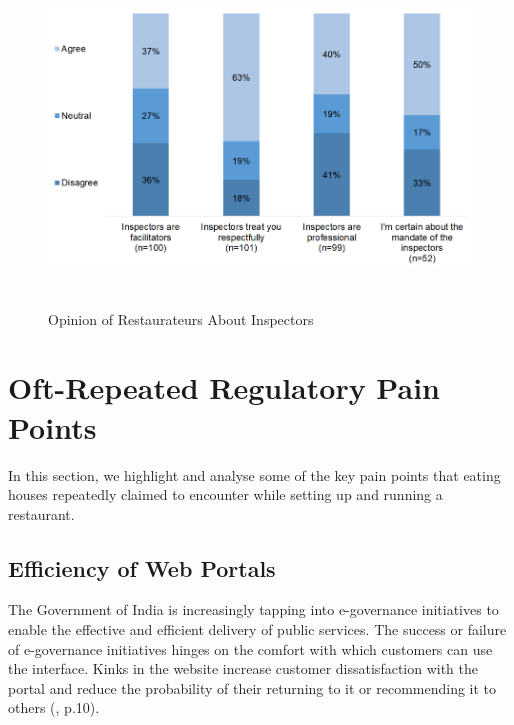 \documentclass[a4paper, 12pt, twoside]{article}
\begin{document}
		\begin{figure}[H]
                    	\centering
                    	\includegraphics[height = 3.5in]{Figure8.png}
                    	\captionsetup{justification=centering}\caption[Optional Caption]{Opinion of Restaurateurs About Inspectors} 
		\end{figure}



		\section{Oft-Repeated Regulatory Pain Points}
		\label{sec:3}
		
		In this section, we highlight and analyse some of the key pain points that eating houses repeatedly claimed to encounter while setting up and running a restaurant.

		\subsection{Efficiency of Web Portals}
		The Government of India is increasingly tapping into e-governance initiatives to enable the effective and efficient delivery of public services. The success or failure of e-governance initiatives hinges on the comfort with which customers can use the 
interface. Kinks in the website increase customer dissatisfaction with the portal and reduce the probability of their returning to it or recommending it to others (\cite{anthopoulos2007applying}, p.10). \\
		
\end{document}
